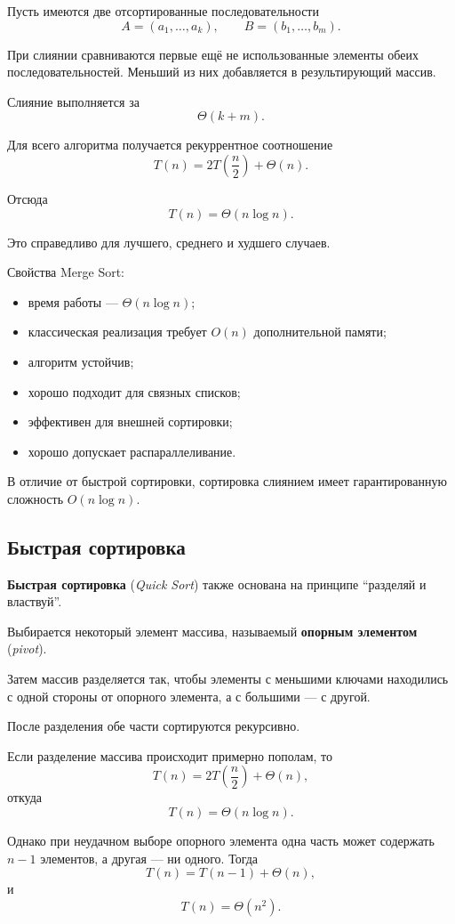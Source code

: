 Пусть имеются две отсортированные последовательности
\[
A=(a_1,\ldots,a_k), \qquad
B=(b_1,\ldots,b_m).
\]

При слиянии сравниваются первые ещё не использованные элементы обеих
последовательностей. Меньший из них добавляется в результирующий массив.

Слияние выполняется за
\[
\Theta(k+m).
\]

Для всего алгоритма получается рекуррентное соотношение
\[
T(n)=2T\left(\frac{n}{2}\right)+\Theta(n).
\]

Отсюда
\[
T(n)=\Theta(n\log n).
\]

Это справедливо для лучшего, среднего и худшего случаев.

Свойства Merge Sort:
\begin{itemize}
	\item время работы --- $\Theta(n\log n)$;
	\item классическая реализация требует $O(n)$ дополнительной памяти;
	\item алгоритм устойчив;
	\item хорошо подходит для связных списков;
	\item эффективен для внешней сортировки;
	\item хорошо допускает распараллеливание.
\end{itemize}

В отличие от быстрой сортировки, сортировка слиянием имеет гарантированную
сложность $O(n\log n)$.

\subsection{Быстрая сортировка}

\textbf{Быстрая сортировка} (\textit{Quick Sort}) также основана на принципе
``разделяй и властвуй''.

Выбирается некоторый элемент массива, называемый
\textbf{опорным элементом} (\textit{pivot}).

Затем массив разделяется так, чтобы элементы с меньшими ключами находились
с одной стороны от опорного элемента, а с большими --- с другой.

После разделения обе части сортируются рекурсивно.

Если разделение массива происходит примерно пополам, то
\[
T(n)=2T\left(\frac{n}{2}\right)+\Theta(n),
\]
откуда
\[
T(n)=\Theta(n\log n).
\]

Однако при неудачном выборе опорного элемента одна часть может содержать
$n-1$ элементов, а другая --- ни одного. Тогда
\[
T(n)=T(n-1)+\Theta(n),
\]
и
\[
T(n)=\Theta(n^2).
\]

